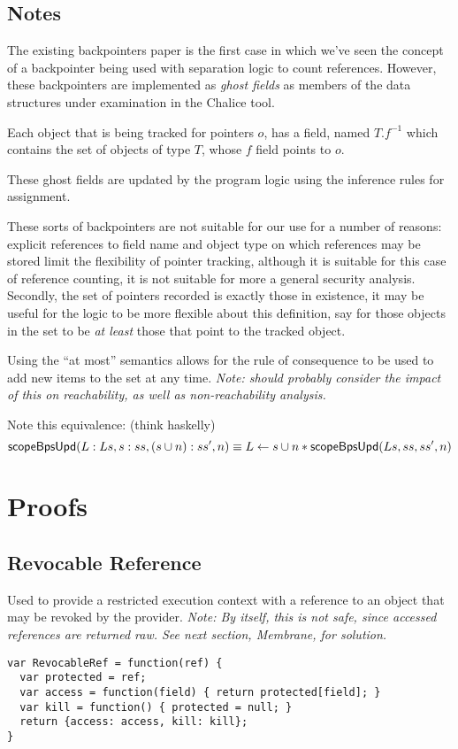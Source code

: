 \documentclass[a4paper]{article}
\begin{document}
\subsection{Notes}
The existing backpointers paper\cite{KassiosKritikos12} is the first case in
which we've seen the concept of a backpointer being used with separation logic
to count references. However, these backpointers are implemented as \emph{ghost
fields} as members of the data structures under examination in the Chalice
tool.

Each object that is being tracked for pointers $o$, has a field, named $T.f^{-1}$
which contains the set of objects of type $T$, whose $f$ field
points to $o$.

These ghost fields are updated by the program logic using the inference rules
for assignment.

These sorts of backpointers are not suitable for our use for a number of
reasons: explicit references to field name and object type on
which references may be stored limit the flexibility of pointer tracking,
although it is suitable for this case of reference counting, it is not suitable
for more a general security analysis. Secondly, the set of pointers recorded is
exactly those in existence, it may be useful for the logic to be more flexible
about this definition, say for those objects in the set to be \emph{at least}
those that point to the tracked object.

Using the ``at most'' semantics allows for the rule of consequence to be used to
add new items to the set at any time. \emph{Note: should probably consider the
impact of this on reachability, as well as non-reachability analysis.}

Note this equivalence: (think haskelly)
\[
  \mathsf{scopeBpsUpd}(L:Ls, s:ss, (s \cup n):ss', n) \equiv L \leftarrow s \cup n \mathbin{*}
  \mathsf{scopeBpsUpd}(Ls, ss, ss', n)
\]

\section{Proofs}
\subsection{Revocable Reference}
Used to provide a restricted execution context with a reference to an object
that may be revoked by the provider.
\emph{Note: By itself, this is not safe, since accessed references are returned
  raw. See next section, Membrane, for solution.}

\begin{verbatim}
var RevocableRef = function(ref) {
  var protected = ref;
  var access = function(field) { return protected[field]; }
  var kill = function() { protected = null; }
  return {access: access, kill: kill};
}
\end{verbatim}
\end{document}
